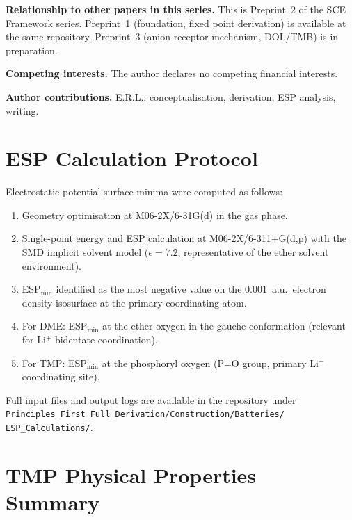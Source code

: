 \documentclass[11pt]{article}
\theoremstyle{plain}
\theoremstyle{definition}
\theoremstyle{remark}
\begin{document}
\noindent\textbf{Relationship to other papers in this series.}
This is Preprint~2 of the SCE Framework series.
Preprint~1 (foundation, fixed point derivation) is available at the
same repository.
Preprint~3 (anion receptor mechanism, DOL/TMB) is in preparation.

\noindent\textbf{Competing interests.}
The author declares no competing financial interests.

\noindent\textbf{Author contributions.}
E.R.L.: conceptualisation, derivation, ESP analysis, writing.

\appendix

\section{ESP Calculation Protocol}
\label{app:esp}

Electrostatic potential surface minima were computed as follows:

\begin{enumerate}[leftmargin=2em]
  \item Geometry optimisation at M06-2X/6-31G(d) in the gas phase.
  \item Single-point energy and ESP calculation at M06-2X/6-311+G(d,p)
        with the SMD implicit solvent model ($\epsilon = 7.2$,
        representative of the ether solvent environment).
  \item ESP$_{\min}$ identified as the most negative value on the
        0.001~a.u.\ electron density isosurface at the primary
        coordinating atom.
  \item For DME: ESP$_{\min}$ at the ether oxygen in the gauche
        conformation (relevant for Li$^+$ bidentate coordination).
  \item For TMP: ESP$_{\min}$ at the phosphoryl oxygen
        (P=O group, primary Li$^+$ coordinating site).
\end{enumerate}

Full input files and output logs are available in the repository under
\texttt{Principles\_First\_Full\_Derivation/Construction/Batteries/\\
ESP\_Calculations/}.

\section{TMP Physical Properties Summary}
\label{app:tmp_props}
\end{document}
